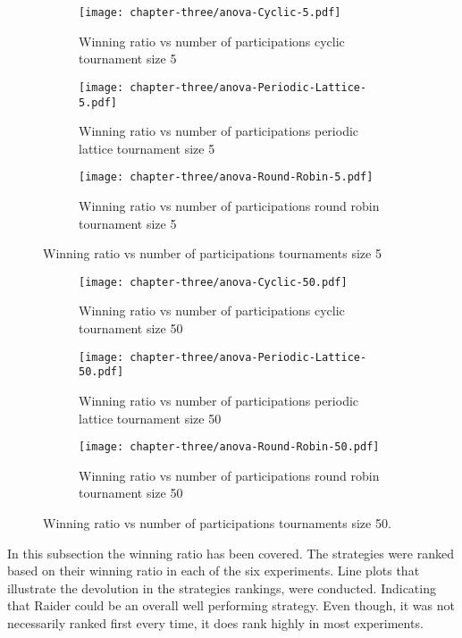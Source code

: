 \begin{figure}[H]
	\centering

	\begin{subfigure}[t]{0.75\textwidth}
		\centering
		\texttt{[image: chapter-three/anova-Cyclic-5.pdf]}
		\caption{Winning ratio vs number of participations cyclic tournament size 5}
	\end{subfigure}
	\hfill
	\begin{subfigure}[t]{0.75\textwidth}\centering
		\centering
		\texttt{[image: chapter-three/anova-Periodic-Lattice-5.pdf]}
		\caption{Winning ratio vs number of participations periodic lattice tournament size 5}
	\end{subfigure}
	\hfill
	\begin{subfigure}[t]{0.75\textwidth}\centering
		\centering
		\texttt{[image: chapter-three/anova-Round-Robin-5.pdf]}
		\caption{Winning ratio vs number of participations round robin tournament size 5}
	\end{subfigure}
	\caption{Winning ratio vs number of participations tournaments size 5}
	\label{fig:winning-ratio-participations-five}
\end{figure}

\begin{figure}[H]
	\centering

	\begin{subfigure}[t]{0.75\textwidth}
		\centering
		\texttt{[image: chapter-three/anova-Cyclic-50.pdf]}
		\caption{Winning ratio vs number of participations cyclic tournament size 50}
	\end{subfigure}
	\hfill
	\begin{subfigure}[t]{0.75\textwidth}\centering
		\centering
		\texttt{[image: chapter-three/anova-Periodic-Lattice-50.pdf]}
		\caption{Winning ratio vs number of participations periodic lattice tournament size 50}
	\end{subfigure}
	\hfill
	\begin{subfigure}[t]{0.75\textwidth}\centering
		\centering
		\texttt{[image: chapter-three/anova-Round-Robin-50.pdf]}
		\caption{Winning ratio vs number of participations round robin tournament size 50}
	\end{subfigure}
	\caption{Winning ratio vs number of participations tournaments size 50.}
	\label{fig:winning-ratio-participations-fifty}
\end{figure}

In this subsection the winning ratio has been covered. The strategies were ranked
based on their winning ratio in each of the six experiments. Line plots that
illustrate the devolution in the strategies rankings, were conducted. Indicating
that Raider could be an overall well performing strategy. Even though, it was
not necessarily ranked first every time, it does rank highly in most experiments.

